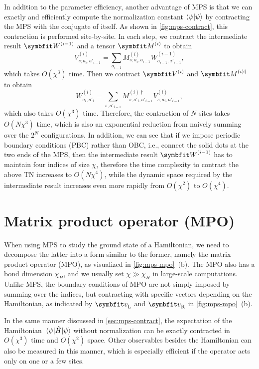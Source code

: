 In addition to the parameter efficiency, another advantage of MPS is that we can exactly and efficiently compute the normalization constant $\ip{\psi}$ by contracting the MPS with the conjugate of itself. As shown in \cref{fig:mps-contract}, this contraction is performed site-by-site. In each step, we contract the intermediate result $\mW^{(i - 1)}$ and a tensor $\mM^{(i)}$ to obtain
\begin{equation}
V^{(i)}_{s; a_i, a'_{i - 1}} = \sum_{a_{i - 1}} M^{(i)}_{s; a_i, a_{i - 1}} W^{(i - 1)}_{a_{i - 1}, a'_{i - 1}},
\end{equation}
which takes $O(\chi^3)$ time. Then we contract $\mV^{(i)}$ and $\mM^{(i) \dagger}$ to obtain
\begin{equation}
W^{(i)}_{a_i, a'_i} = \sum_{s, a'_{i - 1}} M^{(i) \dagger}_{s; a'_i, a'_{i - 1}} V^{(i)}_{s; a_i, a'_{i - 1}},
\end{equation}
which also takes $O(\chi^3)$ time. Therefore, the contraction of $N$ sites takes $O(N \chi^3)$ time, which is also an exponential reduction from naively summing over the $2^N$ configurations. In addition, we can see that if we impose periodic boundary conditions (PBC) rather than OBC, i.e., connect the solid dots at the two ends of the MPS, then the intermediate result $\mW^{(i - 1)}$ has to maintain four indices of size $\chi$, therefore the time complexity to contract the above TN increases to $O(N \chi^4)$, while the dynamic space required by the intermediate result increases even more rapidly from $O(\chi^2)$ to $O(\chi^4)$.

\section{Matrix product operator (MPO)}
\label{sec:mpo}

When using MPS to study the ground state of a Hamiltonian, we need to decompose the latter into a form similar to the former, namely the matrix product operator (MPO), as visualized in \cref{fig:mps-mpo}~(b). The MPO also has a bond dimension $\chi_H$, and we usually set $\chi \gg \chi_H$ in large-scale computations. Unlike MPS, the boundary conditions of MPO are not simply imposed by summing over the indices, but contracting with specific vectors depending on the Hamiltonian, as indicated by $\vv_\text{L}$ and $\vv_\text{R}$ in \cref{fig:mps-mpo}~(b).

In the same manner discussed in \cref{sec:mps-contract}, the expectation of the Hamiltonian $\mel{\psi}{\hat{H}}{\psi}$ without normalization can be exactly contracted in $O(\chi^3)$ time and $O(\chi^2)$ space. Other observables besides the Hamiltonian can also be measured in this manner, which is especially efficient if the operator acts only on one or a few sites.


